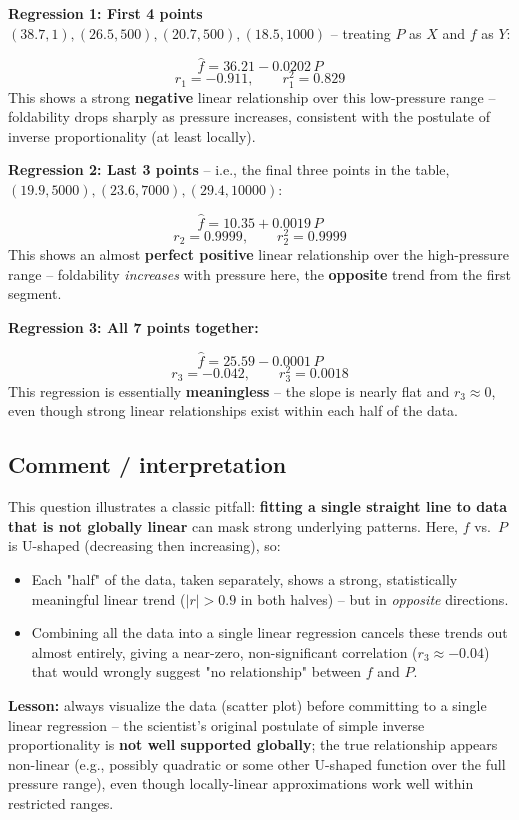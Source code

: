 \documentclass[11pt]{article}
\begin{document}
\textbf{Regression 1: First 4 points} $(38.7,1), (26.5,500), (20.7,500), (18.5,1000)$ -- treating $P$ as $X$ and $f$ as $Y$:

\[
\hat{f} = 36.21 - 0.0202\,P
\]
\[
\boxed{r_1 = -0.911, \qquad r_1^2 = 0.829}
\]
This shows a strong \textbf{negative} linear relationship over this low-pressure range -- foldability drops sharply as pressure increases, consistent with the postulate of inverse proportionality (at least locally).

\textbf{Regression 2: Last 3 points} -- i.e., the final three points in the table, $(19.9,5000), (23.6,7000), (29.4,10000)$:

\[
\hat{f} = 10.35 + 0.0019\,P
\]
\[
\boxed{r_2 = 0.9999, \qquad r_2^2 = 0.9999}
\]
This shows an almost \textbf{perfect positive} linear relationship over the high-pressure range -- foldability \emph{increases} with pressure here, the \textbf{opposite} trend from the first segment.

\textbf{Regression 3: All 7 points together:}

\[
\hat{f} = 25.59 - 0.0001\,P
\]
\[
\boxed{r_3 = -0.042, \qquad r_3^2 = 0.0018}
\]
This regression is essentially \textbf{meaningless} -- the slope is nearly flat and $r_3 \approx 0$, even though strong linear relationships exist within each half of the data.

\subsection*{Comment / interpretation}
This question illustrates a classic pitfall: \textbf{fitting a single straight line to data that is not globally linear} can mask strong underlying patterns. Here, $f$ vs.\ $P$ is U-shaped (decreasing then increasing), so:
\begin{itemize}
\item Each "half" of the data, taken separately, shows a strong, statistically meaningful linear trend ($|r|>0.9$ in both halves) -- but in \emph{opposite} directions.
\item Combining all the data into a single linear regression cancels these trends out almost entirely, giving a near-zero, non-significant correlation ($r_3\approx -0.04$) that would wrongly suggest "no relationship" between $f$ and $P$.
\end{itemize}
\textbf{Lesson:} always visualize the data (scatter plot) before committing to a single linear regression -- the scientist's original postulate of simple inverse proportionality is \textbf{not well supported globally}; the true relationship appears non-linear (e.g., possibly quadratic or some other U-shaped function over the full pressure range), even though locally-linear approximations work well within restricted ranges.
\end{document}
